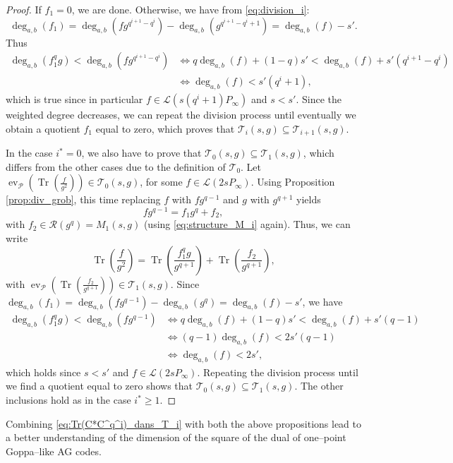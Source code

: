 \documentclass[lettersize,journal]{IEEEtran}
\theoremstyle{plain}
\theoremstyle{definition}
\theoremstyle{remark}
\DeclareMathOperator{\ev}{ev}
\DeclareMathOperator{\trace}{Tr}
\newcommand{\calP}{\mathcal{P}}
\newcommand{\calL}{\mathcal{L}}
\newcommand{\calR}{\mathcal{R}}
\newcommand{\calT}{\mathcal{T}}
\newcommand{\Tr}[1]{\trace\!\left(#1\right)}
\newcommand{\degab}[1]{\deg_{a,b}\left(#1\right)}
\begin{document}
\begin{proof}
		If $f_1=0$, we are done. Otherwise, we have from \eqref{eq:division_i}:
		$$\degab{f_1} = \degab{fg^{q^{i+1}-q^i}} - \degab{g^{q^{i+1}-q^i+1}} = \degab{f}-s'.$$
		Thus
		\begin{align*}
			\degab{f_1^qg} < \degab{fg^{q^{i+1}-q^i}} & \iff q\degab{f} +(1-q)s' < \degab{f} +s'(q^{i+1}-q^i) \\
			& \iff \degab{f} < s'(q^{i}+1),
		\end{align*}
		which is true since in particular $f \in \calL(s(q^i+1)P_\infty)$ and $s<s'$. Since the weighted degree decreases, we can repeat the division process until eventually we obtain a quotient $f_1$ equal to zero, which proves that $\calT_i(s,g) \subseteq \calT_{i+1}(s,g)$.
		
		In the case $i^*=0$, we also have to prove that $\calT_0(s,g) \subseteq \calT_1(s,g)$, which differs from the other cases due to the definition of $\calT_0$. Let $\ev_{\calP}\left(\Tr{\frac{f}{g^2}}\right) \in \calT_0(s,g)$, for some $f \in \calL(2sP_\infty)$. Using Proposition \ref{prop:div_grob}, this time replacing $f$ with $fg^{q-1}$ and $g$ with $g^{q+1}$ yields
		$$fg^{q-1} = f_1g^q + f_2,$$ with $f_2 \in \calR(g^q) = M_1(s,g)$ (using \eqref{eq:structure_M_i} again).
		Thus, we can write
		$$ \Tr{\frac{f}{g^2}} = \Tr{\frac{f_1^qg}{g^{q+1}}}  + \Tr{\frac{f_2}{g^{q+1}}}, $$
		with $\ev_{\calP}\left(\Tr{\frac{f_2}{g^{q+1}}}\right) \in \calT_1(s,g)$. Since $\degab{f_1} = \degab{fg^{q-1}} - \degab{g^q} = \degab{f}-s'$, we have 
		\begin{align*}
			\degab{f_1^qg} < \degab{fg^{q-1}} & \iff q\degab{f} +(1-q)s' < \degab{f} + s'(q-1)\\
			& \iff (q-1)\degab{f} < 2s'(q-1)\\
			& \iff \degab{f} < 2s',
		\end{align*}
		which holds since $s<s'$ and $f \in \calL(2sP_\infty)$. Repeating the division process until we find a quotient equal to zero shows that $\calT_0(s,g) \subseteq \calT_1(s,g)$. The other inclusions hold as in the case $i^* \geq 1$.
	\end{proof}
	Combining \eqref{eq:Tr(C*C^q^i)_dans_T_i} with both the above propositions lead to a better understanding of the dimension of the square of the dual of one--point Goppa--like AG codes. 
\end{document}
